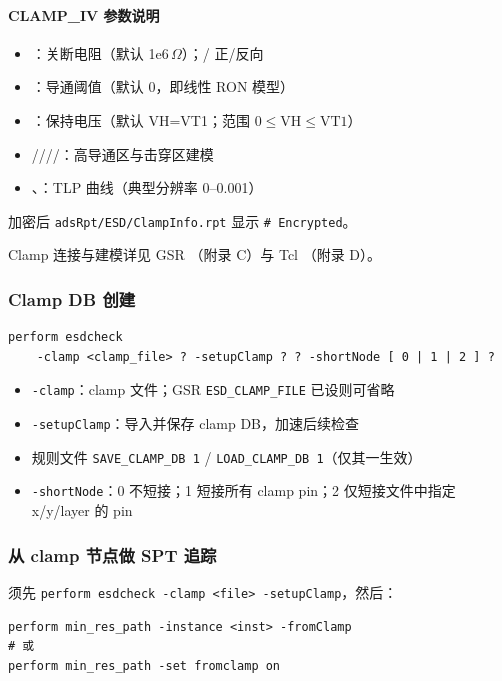 \paragraph{CLAMP\_IV 参数说明}
\begin{itemize}
  \item {}：关断电阻（默认 1e6\,$\Omega$）；/ 正/反向
  \item {}：导通阈值（默认 0，即线性 RON 模型）
  \item {}：保持电压（默认 VH=VT1；范围 $0 \le \mathrm{VH} \le \mathrm{VT1}$）
  \item {}////：高导通区与击穿区建模
  \item {}、：TLP 曲线（典型分辨率 0--0.001）
\end{itemize}

加密后 \texttt{adsRpt/ESD/ClampInfo.rpt} 显示 \texttt{\# Encrypted}。

\begin{seeAlsoBox}
Clamp 连接与建模详见 GSR （附录 C）与 Tcl （附录 D）。
\end{seeAlsoBox}

\subsubsection{Clamp DB 创建}
\begin{lstlisting}
perform esdcheck
    -clamp <clamp_file> ? -setupClamp ? ? -shortNode [ 0 | 1 | 2 ] ?
\end{lstlisting}

\begin{itemize}
  \item \texttt{-clamp}：clamp 文件；GSR \texttt{ESD\_CLAMP\_FILE} 已设则可省略
  \item \texttt{-setupClamp}：导入并保存 clamp DB，加速后续检查
  \item 规则文件 \texttt{SAVE\_CLAMP\_DB 1} / \texttt{LOAD\_CLAMP\_DB 1}（仅其一生效）
  \item \texttt{-shortNode}：0 不短接；1 短接所有 clamp pin；2 仅短接文件中指定 x/y/layer 的 pin
\end{itemize}

\subsubsection{从 clamp 节点做 SPT 追踪}
须先 \texttt{perform esdcheck -clamp <file> -setupClamp}，然后：
\begin{lstlisting}
perform min_res_path -instance <inst> -fromClamp
# 或
perform min_res_path -set fromclamp on
\end{lstlisting}









